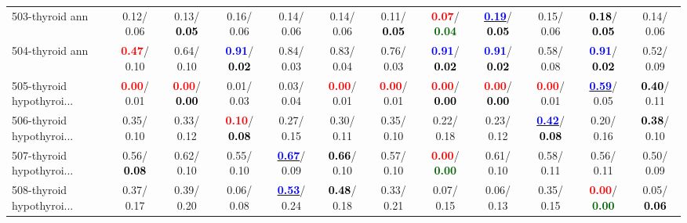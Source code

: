 \begin{table}[h]
\begin{center}
{\begin{tabular}{lc|c|c|c|c|c|c|c|c|c|c}
503-thyroid ann &   0.12/  0.06 &   0.13/\textcolor{black}{\textbf{  0.05}} &   0.16/  0.06 &   0.14/  0.06 &   0.14/  0.06 &   0.11/\textcolor{black}{\textbf{  0.05}} & \textcolor{red}{\textbf{  0.07}}/\textcolor{darkgreen}{\textbf{  0.04}} & \underline{\textcolor{blue}{\textbf{  0.19}}}/\textcolor{black}{\textbf{  0.05}} &   0.15/  0.06 & \textcolor{black}{\textbf{  0.18}}/\textcolor{black}{\textbf{  0.05}} &   0.14/  0.06 \\
504-thyroid ann & \textcolor{red}{\textbf{  0.47}}/  0.10 &   0.64/  0.10 & \textcolor{blue}{\textbf{  0.91}}/\textcolor{black}{\textbf{  0.02}} &   0.84/  0.03 &   0.83/  0.04 &   0.76/  0.03 & \textcolor{blue}{\textbf{  0.91}}/\textcolor{black}{\textbf{  0.02}} & \textcolor{blue}{\textbf{  0.91}}/\textcolor{black}{\textbf{  0.02}} &   0.58/  0.08 & \textcolor{blue}{\textbf{  0.91}}/\textcolor{black}{\textbf{  0.02}} &   0.52/  0.09 \\
505-thyroid hypothyroi... & \textcolor{red}{\textbf{  0.00}}/  0.01 & \textcolor{red}{\textbf{  0.00}}/\textcolor{black}{\textbf{  0.00}} &   0.01/  0.03 &   0.03/  0.04 & \textcolor{red}{\textbf{  0.00}}/  0.01 & \textcolor{red}{\textbf{  0.00}}/  0.01 & \textcolor{red}{\textbf{  0.00}}/\textcolor{black}{\textbf{  0.00}} & \textcolor{red}{\textbf{  0.00}}/\textcolor{black}{\textbf{  0.00}} & \textcolor{red}{\textbf{  0.00}}/  0.01 & \underline{\textcolor{blue}{\textbf{  0.59}}}/  0.05 & \textcolor{black}{\textbf{  0.40}}/  0.11 \\
506-thyroid hypothyroi... &   0.35/  0.10 &   0.33/  0.12 & \textcolor{red}{\textbf{  0.10}}/\textcolor{black}{\textbf{  0.08}} &   0.27/  0.15 &   0.30/  0.11 &   0.35/  0.10 &   0.22/  0.18 &   0.23/  0.12 & \underline{\textcolor{blue}{\textbf{  0.42}}}/\textcolor{black}{\textbf{  0.08}} &   0.20/  0.16 & \textcolor{black}{\textbf{  0.38}}/  0.10 \\
507-thyroid hypothyroi... &   0.56/\textcolor{black}{\textbf{  0.08}} &   0.62/  0.10 &   0.55/  0.10 & \underline{\textcolor{blue}{\textbf{  0.67}}}/  0.09 & \textcolor{black}{\textbf{  0.66}}/  0.10 &   0.57/  0.10 & \textcolor{red}{\textbf{  0.00}}/\textcolor{darkgreen}{\textbf{  0.00}} &   0.61/  0.10 &   0.58/  0.11 &   0.56/  0.11 &   0.50/  0.09 \\
508-thyroid hypothyroi... &   0.37/  0.17 &   0.39/  0.20 &   0.06/  0.08 & \underline{\textcolor{blue}{\textbf{  0.53}}}/  0.24 & \textcolor{black}{\textbf{  0.48}}/  0.18 &   0.33/  0.21 &   0.07/  0.15 &   0.06/  0.13 &   0.35/  0.15 & \textcolor{red}{\textbf{  0.00}}/\textcolor{darkgreen}{\textbf{  0.00}} &   0.05/\textcolor{black}{\textbf{  0.06}} \\ \hline

\end{tabular}}
\end{center}
\end{table}
